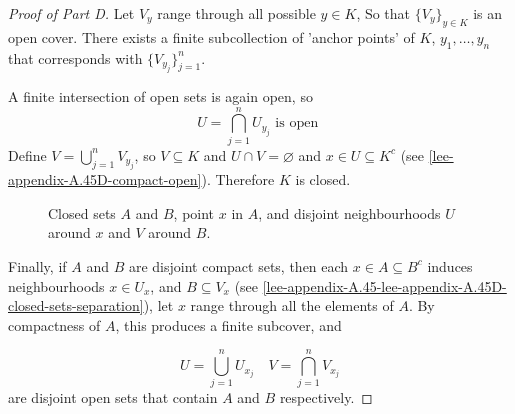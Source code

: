 \documentclass[../../main.tex]{subfiles}
\begin{document}
\begin{proof}[Proof of  Part D]
Let $V_y$ range through all possible $y\in K$, So that $\{V_y\}_{y\in K}$ is an open cover. There exists a finite subcollection of 'anchor points' of $K$, $y_1,\ldots,y_n$ that corresponds with $\{V_{y_j}\}_{j=1}^n$.

A finite intersection of open sets is again open, so 
\[
    U = \bigcap_{j=1}^n U_{y_j}\text{ is open }
\]
Define $V = \bigcup_{j=1}^nV_{y_j}$, so $V\subseteq K$ and $U\cap V = \varnothing$ and $x\in U\subseteq K^c$ (see \cref{lee-appendix-A.45D-compact-open}). Therefore $K$ is closed.\\



\begin{figure}[htbp]
    \centering
    \caption{Closed sets $A$ and $B$, point $x$ in $A$, and disjoint neighbourhoods $U$ around $x$ and $V$ around $B$.}
    \label{lee-appendix-A.45D-closed-sets-separation}
\end{figure}

Finally, if $A$ and $B$ are disjoint compact sets, then each $x\in A\subseteq B^c$ induces neighbourhoods $x\in U_x$, and $B\subseteq V_x$ (see \cref{lee-appendix-A.45-lee-appendix-A.45D-closed-sets-separation}), let $x$ range through all the elements of $A$. By compactness of $A$, this produces a finite subcover, and 

\[
    U = \bigcup_{j=1}^n U_{x_j}\quad V=\bigcap_{j=1}^n V_{x_j}
\]
are disjoint open sets that contain $A$ and $B$ respectively.





\end{proof}
\clearpage
\end{document}
